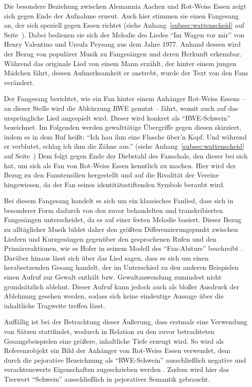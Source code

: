 Die besondere Beziehung zwischen Alemannia Aachen und Rot-Weiss Essen zeigt sich gegen Ende der Aufnahme erneut.
Auch hier stimmen sie einen Fangesang an, der sich speziell gegen Essen richtet (siehe Anhang~\ref{subsec:wattenscheid} auf Seite~\pageref{subsec:wattenscheid}).
Dabei bedienen sie sich der Melodie des Liedes "`Im Wagen vor mir"' von Henry Valentino und Ursula Peysang aus dem Jahre 1977.
Anhand dessen wird der Bezug von populärer Musik zu Fangesängen und deren Herkunft erkennbar.
Während das originale Lied von einem Mann erzählt, der hinter einem jungen Mädchen fährt, dessen Aufmerksamkeit er anstrebt, wurde der Text von den Fans verändert.

Der Fangesang berichtet, wie ein Fan hinter einem Anhänger Rot-Weiss Essens – an dieser Stelle wird die Abkürzung RWE genutzt – fährt, womit auch auf das ursprüngliche Lied angespielt wird.
Dieser wird konkret als "`RWE-Schwein"' bezeichnet.
Im Folgenden werden gewalttätige Übergriffe gegen diesen skizziert, indem es in dem Ruf heißt:
"`Ich hau ihm eine Flasche über'n Kopf.
Und während er verblutet, schlag ich ihm die Zähne aus."' (siehe Anhang~\ref{subsec:wattenscheid} auf Seite~\pageref{subsec:wattenscheid})
Dem folgt gegen Ende der Diebstahl des Fanschals, den dieser bei sich hat, um sich als Fan von Rot-Weiss Essen kenntlich zu machen.
Hier wird der Bezug zu den Fanutensilien hergestellt und auf die Rivalität der Vereine hingewiesen, da der Fan seines identitätsstiftenden Symbols beraubt wird.

Bei diesem Fangesang handelt es sich um ein klassisches Fanlied, dass sich in besonderer Form dadurch von den zuvor behandelten und transkribierten Fangesängen unterscheidet, da es auf einer festen Melodie basiert.
Dieser Bezug zu alltäglicher Musik bildet daher den größten Differenzierungspunkt zwischen Liedern und Kurzgesängen gegenüber den gesprochenen Rufen und den Primärreaktionen, wie es Hofer in seinem Modell des "`Fan-Abiturs"' beschreibt \cite[S. 15]{RK98}.
Darüber hinaus lässt sich über das Lied sagen, dass es sich um einen herabsetzenden Gesang handelt, der im Unterschied zu den anderen Beispielen einen Aufruf zur Gewalt enthält bzw. Gewaltanwendung zumindest nicht grundsätzlich ablehnt.
Dieser Aufruf kann jedoch auch als bloßer Ausdruck der Ablehnung gesehen werden, sodass sich keine eindeutige Aussage über die inhaltliche Tragweite treffen lässt.

Auffällig ist bei der Betrachtung dieser Äußerung, dass erstmals eine Verwendung von Sätzen stattfindet, wodurch in Relation zu den zuvor betrachteten Gesangsbeispielen eine größere, inhaltliche Tiefe erzeugt wird.
So wird als Referenzobjekt ein Bild der Anhänger von Rot-Weiss Essen verwendet, dem durch die pejorative Bezeichnung als "`RWE-Schwein"' ausschließlich negative und verachtenswerte Eigenschaften zugeschrieben werden \cite{Dud15}.
Zudem wird hier das Tierwort "`Schwein"' ausschließlich in pejorativer Semantik gebraucht.

